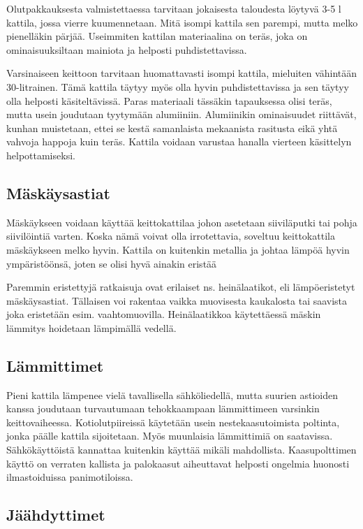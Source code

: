 \documentclass[a4paper,11pt]{report}
\begin{document}
Olutpakkauksesta valmistettaessa tarvitaan jokaisesta taloudesta löytyvä 3-5 l kattila, jossa vierre kuumennetaan. Mitä isompi kattila sen parempi, mutta melko pienelläkin pärjää. Useimmiten kattilan materiaalina on teräs, joka on ominaisuuksiltaan mainiota ja helposti puhdistettavissa.

Varsinaiseen keittoon tarvitaan huomattavasti isompi kattila, mieluiten vähintään 30-litrainen. Tämä kattila täytyy myös olla hyvin puhdistettavissa ja sen täytyy olla helposti käsiteltävissä. Paras materiaali tässäkin tapauksessa olisi teräs, mutta usein joudutaan tyytymään alumiiniin. Alumiinikin ominaisuudet riittävät, kunhan muistetaan, ettei se kestä samanlaista mekaanista rasitusta eikä yhtä vahvoja happoja kuin teräs. Kattila voidaan varustaa hanalla vierteen käsittelyn helpottamiseksi.

\subsection*{Mäskäysastiat}

Mäskäykseen voidaan käyttää keittokattilaa johon asetetaan siiviläputki tai pohja siivilöintiä varten. Koska nämä voivat olla irrotettavia, soveltuu keittokattila mäskäykseen melko hyvin. Kattila on kuitenkin metallia ja johtaa lämpöä hyvin ympäristöönsä, joten se olisi hyvä ainakin eristää

Paremmin eristettyjä ratkaisuja ovat erilaiset ns. heinälaatikot, eli lämpöeristetyt mäskäysastiat. Tällaisen voi rakentaa vaikka muovisesta kaukalosta tai saavista joka eristetään esim. vaahtomuovilla. Heinälaatikkoa käytettäessä mäskin lämmitys hoidetaan lämpimällä vedellä.

\subsection*{Lämmittimet}
Pieni kattila lämpenee vielä tavallisella sähköliedellä, mutta suurien astioiden kanssa joudutaan turvautumaan tehokkaampaan lämmittimeen varsinkin keittovaiheessa. Kotiolutpiireissä käytetään usein nestekaasutoimista poltinta, jonka päälle kattila sijoitetaan. Myös muunlaisia lämmittimiä on saatavissa. Sähkökäyttöistä kannattaa kuitenkin käyttää mikäli mahdollista. Kaasupolttimen käyttö on verraten kallista ja palokaasut aiheuttavat helposti ongelmia huonosti ilmastoiduissa panimotiloissa.

\subsection*{Jäähdyttimet}
\end{document}
